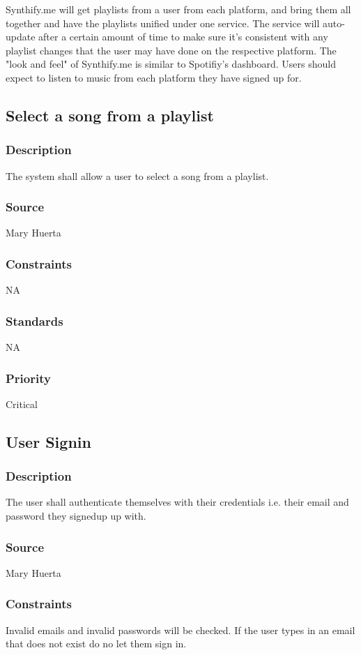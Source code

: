 Synthify.me will get playlists from a user from each platform, and bring them all together and have the playlists unified under one service. The service will auto-update after a certain amount of time to make sure it's consistent with any playlist changes that the user may have done on the respective platform. The "look and feel" of Synthify.me is similar to Spotifiy's dashboard. Users should expect to listen to music from each platform they have signed up for.

\subsection{Select a song from a playlist}
\subsubsection{Description}
The system shall allow a user to select a song from a playlist.
\subsubsection{Source}
Mary Huerta
\subsubsection{Constraints}
NA
\subsubsection{Standards}
NA
\subsubsection{Priority}
Critical


\subsection{User Signin}
\subsubsection{Description}
The user shall authenticate themselves with their credentials i.e. their email and password they signedup up with.
\subsubsection{Source}
Mary Huerta
\subsubsection{Constraints}
Invalid emails and invalid passwords will be checked. If the user types in an email that does not exist do no let them sign in.
